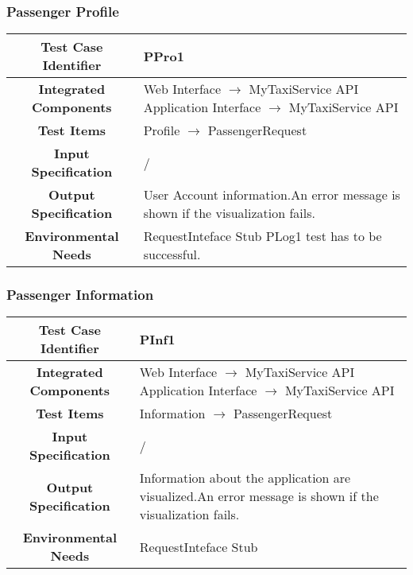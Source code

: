 \documentclass[11pt, a4paper,titlepage]{article}
\begin{document}
	\subsubsection{Passenger Profile }
	\begin{tabularx}{\textwidth}{| c|X|}
		\hline \textbf{Test Case Identifier} & \label{PPro1}PPro1 \\
		\hline \textbf{Integrated Components} &  Web Interface $\rightarrow $ MyTaxiService API \newline 
		Application Interface $\rightarrow $ MyTaxiService API \\ 
		\hline \textbf{Test Items} & Profile $\rightarrow $ PassengerRequest \\
		\hline \textbf{Input Specification} & / \\
		\hline \textbf{Output Specification} &  User Account information.\newline 	An error message is shown if the visualization fails. \\
		\hline \textbf{Environmental Needs} & RequestInteface Stub \newline PLog1 test has to be successful. \\
		\hline
	\end{tabularx}
	\newline
	\newline
	\subsubsection{Passenger Information }
	\begin{tabularx}{\textwidth}{| c|X|}
		\hline \textbf{Test Case Identifier} & \label{PInf1}PInf1 \\
		\hline \textbf{Integrated Components} &  Web Interface $\rightarrow $ MyTaxiService API \newline 
		Application Interface $\rightarrow $ MyTaxiService API \\
		\hline \textbf{Test Items} & Information $\rightarrow $ PassengerRequest \\
		\hline \textbf{Input Specification} & / \\
		\hline \textbf{Output Specification} & Information about the application are visualized.\newline An error message is shown if the visualization fails. \\
		\hline \textbf{Environmental Needs} & RequestInteface Stub \\
		\hline
	\end{tabularx}
	\newline
	\newline
\end{document}
